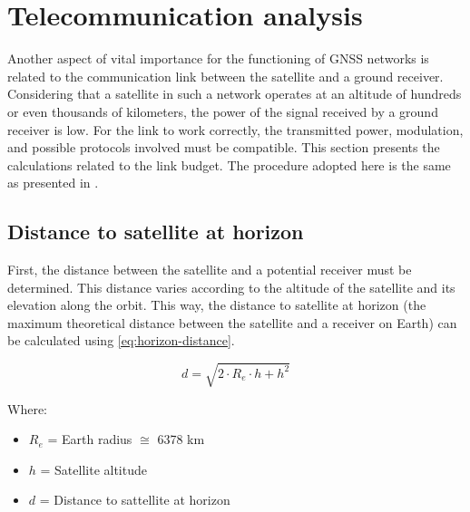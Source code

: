 \section{Telecommunication analysis} \label{sec:telecom-analysis-method}


Another aspect of vital importance for the functioning of GNSS networks is related to the communication link between the satellite and a ground receiver. Considering that a satellite in such a network operates at an altitude of hundreds or even thousands of kilometers, the power of the signal received by a ground receiver is low. For the link to work correctly, the transmitted power, modulation, and possible protocols involved must be compatible. This section presents the calculations related to the link budget. The procedure adopted here is the same as presented in \cite{larson2005}.

\subsection{Distance to satellite at horizon}

First, the distance between the satellite and a potential receiver must be determined. This distance varies according to the altitude of the satellite and its elevation along the orbit. This way, the distance to satellite at horizon (the maximum theoretical distance between the satellite and a receiver on Earth) can be calculated using \autoref{eq:horizon-distance}.

\begin{equation} \label{eq:horizon-distance}
d = \sqrt{2\cdot R_{e}\cdot h + h^{2}}
\end{equation}

Where:

\begin{itemize}
    \item $R_{e}$ = Earth radius $\cong$ 6378 km
    \item $h$ = Satellite altitude
    \item $d$ = Distance to sattellite at horizon
\end{itemize}

